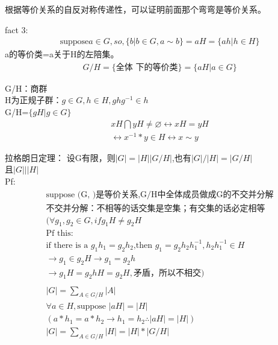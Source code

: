 \documentclass[12pt, a4paper]{article}  %
\begin{document}
根据等价关系的自反对称传递性，可以证明前面那个弯弯是等价关系。

fact 3:\\
\begin{align}
    &\text{suppose} a\in G,so,\{b|b\in G,a\sim b\}=aH=\{ah|h\in H\}
\end{align}
a的等价类=a关于H的左陪集。\\

\begin{align}
    &G/H=\{\text{全体~下的等价类}\}=\{aH|a\in G\}
\end{align}

G/H：商群\\
H为正规子群：\(g\in G,h\in H,ghg^{-1}\in h\)\\
G/H=\(\{gH|g\in G\}\)\\

\begin{align}
    &xH\bigcap yH\ne \varnothing \leftrightarrow xH=yH\\
    &\leftrightarrow x^{-1}*y\in H\leftrightarrow x\sim y
\end{align}

拉格朗日定理：
设G有限，则\(|G|=|H||G/H|\),也有\(|G|/|H|=|G/H|\)\\
且\(|G|||H|\)\\
Pf:\\
\begin{align}
    &\text{suppose (G,~)是等价关系,G/H中全体成员做成G的不交并分解}\\
    &\text{不交并分解：不相等的话交集是空集；有交集的话必定相等}\\
    &(\forall g_1,g_2\in G,if g_1H\neq g_2H\\
    &\text{Pf this}:\\
    &\text{if there is a \(g_1h_1=g_2h_2\),then }g_1=g_2h_2h_1^{-1}, h_2h_1^{-1}\in H\\
    &  \rightarrow g_1\in g_2H\rightarrow g_1=g_2h\\
    &\rightarrow g_1H=g_2hH=g_2H,\text{矛盾，所以不相交})\\
    &\\
    &|G|=\sum _{A\in G/H}|A|\\
    &\forall a\in H,\text{suppose }|aH|=|H|\\
    &(a*h_1=a*h_2\rightarrow h_1=h_2\therefore |aH|=|H|)\\
    &|G|=\sum _{A\in G/H}|H|=|H|*|G/H|
\end{align}
\end{document}
